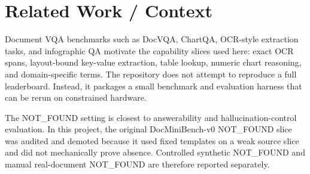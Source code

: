 \section{Related Work / Context}

Document VQA benchmarks such as DocVQA, ChartQA, OCR-style extraction tasks, and
infographic QA motivate the capability slices used here: exact OCR spans,
layout-bound key-value extraction, table lookup, numeric chart reasoning, and
domain-specific terms. The repository does not attempt to reproduce a full
leaderboard. Instead, it packages a small benchmark and evaluation harness that
can be rerun on constrained hardware.

The NOT\_FOUND setting is closest to answerability and hallucination-control
evaluation. In this project, the original DocMiniBench-v0 NOT\_FOUND slice was
audited and demoted because it used fixed templates on a weak source slice and
did not mechanically prove absence. Controlled synthetic NOT\_FOUND and manual
real-document NOT\_FOUND are therefore reported separately.
